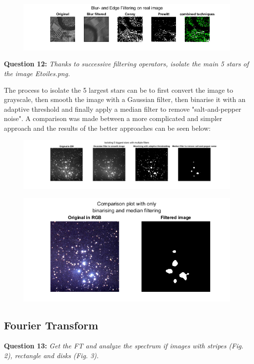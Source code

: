 \begin{figure}[H]
    \centering
    \includegraphics[width=\linewidth]{Doc/Graphics/Part1/Q11b.png}
\end{figure}


\textbf{Question 12:}
\textit{Thanks to successive ﬁltering operators, isolate the main 5 stars of the image Etoiles.png.}

The process to isolate the 5 largest stars can be to first convert the image to grayscale, then smooth the image with a Gaussian filter, then binarise it with an adaptive threshold and finally apply a median filter to remove "salt-and-pepper noise". A comparison was made between a more complicated and simpler approach and the results of the better approaches can be seen below:

\begin{figure}[H]
    \centering
    \includegraphics[width=\linewidth]{Doc/Graphics/Part1/Q12a.png}
\end{figure}

\begin{figure}[H]
    \centering
    \includegraphics[width=0.5\linewidth]{Doc/Graphics/Part1/Q12b.png}
\end{figure}


\subsection{Fourier Transform}
\textbf{Question 13:}
\textit{Get the FT and analyze the spectrum if images with stripes (Fig. 2), rectangle and disks (Fig. 3).}

